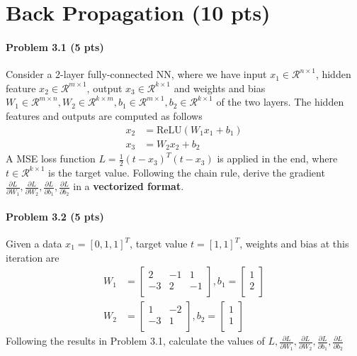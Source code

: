 \section{Back Propagation (10 pts)}


\paragraph{Problem 3.1 (5 pts)}
Consider a 2-layer fully-connected NN, where we have input $x_{1}\in \mathcal{R}^{n \times 1}$, hidden feature $x_{2}\in \mathcal{R}^{m \times 1}$, output $x_{3}\in \mathcal{R}^{k \times 1}$ and weights and bias $W_{1}\in \mathcal{R}^{m \times n}, W_{2}\in \mathcal{R}^{k \times m}, b_{1}\in \mathcal{R}^{m \times 1}, b_{2}\in \mathcal{R}^{k \times 1}$ of the two layers. The hidden features and outputs are computed as follows
\begin{align}
    x_{2} &= \text{ReLU}(W_{1}x_{1} + b_{1}) \\
    x_{3} &= W_{2}x_{2} + b_{2}
\end{align}
A MSE loss function $L = \frac{1}{2}(t-x_{3})^T(t-x_{3})$ is applied in the end, where $t\in \mathcal{R}^{k \times 1}$ is the target value. Following the chain rule, derive the gradient $\frac{\partial L}{\partial W_{1}}, \frac{\partial L}{\partial W_{2}}, \frac{\partial L}{\partial b_{1}}, \frac{\partial L}{\partial b_{2}}$ in a \textbf{vectorized format}.

\paragraph{Problem 3.2 (5 pts)}
Given a data $x_{1} = [0, 1 ,1]^T$, target value $t = [1, 1]^T$, weights and bias at this iteration are 
\begin{align}
    W_{1} &= \begin{bmatrix}
        2 & -1 & 1\\
        -3 & 2 & -1\\
    \end{bmatrix}, b_{1} = \begin{bmatrix}
        1 \\
        2 \\
    \end{bmatrix} \\
    W_{2} &= \begin{bmatrix}
        1 & -2\\
        -3 & 1\\
    \end{bmatrix}, b_{2} = \begin{bmatrix}
        1 \\
        1 \\
    \end{bmatrix}
\end{align}
Following the results in Problem 3.1, calculate the values of $L, \frac{\partial L}{\partial W_{1}}, \frac{\partial L}{\partial W_{2}}, \frac{\partial L}{\partial b_{1}}, \frac{\partial L}{\partial b_{2}}$

